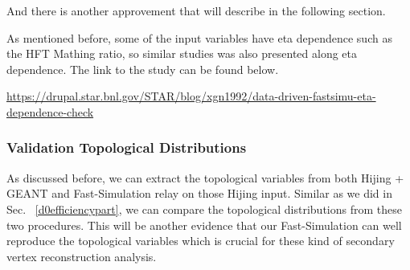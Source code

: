 And there is another approvement that will describe in the following section.

As mentioned before, some of the input variables have eta dependence such as the HFT Mathing ratio, so similar studies was also presented along eta dependence. The link to the study can be found below.

\url{https://drupal.star.bnl.gov/STAR/blog/xgn1992/data-driven-fastsimu-eta-dependence-check}

\subsubsection{Validation Topological Distributions}
\label{validationTopo}

As discussed before, we can extract the topological variables from both Hijing + GEANT and Fast-Simulation relay on those Hijing input. Similar as we did in Sec. ~\ref{d0efficiencypart}, we can compare the topological distributions from these two procedures. This will be another evidence that our Fast-Simulation can well reproduce the topological variables which is crucial for these kind of secondary vertex reconstruction analysis.

